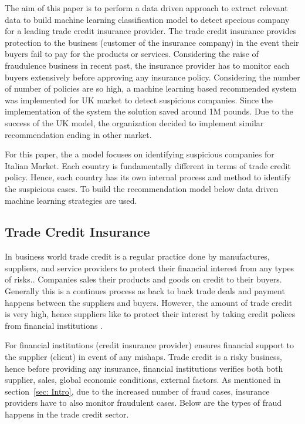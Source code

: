 

The aim of this paper is to perform a data driven approach to extract relevant data to build machine learning classification model to detect specious company for a leading trade credit insurance provider. The trade credit insurance provides protection to the business (customer of the insurance company) in the event their buyers fail to pay for the products or services. Considering the raise of fraudulence business in recent past, the insurance provider has to monitor each buyers extensively before approving any insurance policy. Considering the number of number of policies are so high, a machine learning based recommended system was implemented for UK market to detect suspicious companies. Since the implementation of the system the solution saved around 1M pounds. Due to the success of the UK model, the organization decided to implement similar recommendation ending in other market.

For this paper, the a model focuses on identifying suspicious companies for Italian Market. Each country is fundamentally different in terms of trade credit policy. Hence, each country has its own internal process and method to identify the suspicious cases. To build the recommendation model below data driven machine learning strategies are used.


\subsection{Trade Credit Insurance}\label{subsec:trade-credit-insurance}
In business world trade credit is a regular practice done by manufactures, suppliers, and service providers to protect their financial interest from any types of risks.. Companies sales their products and goods on credit to their buyers. Generally this is a continues process as back to back trade deals and payment happens between the suppliers and buyers. However, the amount of trade credit is very high, hence suppliers like to protect their interest by taking credit polices from financial institutions  .

For financial institutions (credit insurance provider) ensures financial support to the supplier (client) in event of any mishaps. Trade credit is a risky business, hence before providing any insurance, financial institutions verifies both both supplier, sales, global economic conditions, external factors. As mentioned in section~\ref{sec: Intro}, due to the increased number of fraud cases, insurance providers have to also monitor fraudulent cases. Below are the types of fraud happens in the trade credit sector.

